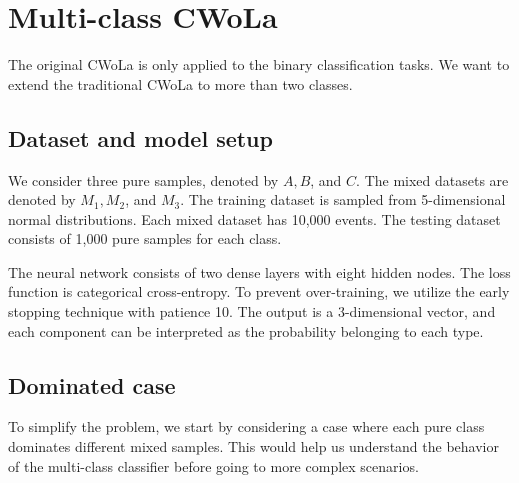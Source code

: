 \documentclass[12pt]{article}
\begin{document}
\section{Multi-class CWoLa}%
\label{sec:multi_class_cwola}
    The original CWoLa is only applied to the binary classification tasks. We want to extend the traditional CWoLa to more than two classes.

    \subsection{Dataset and model setup}%
    \label{sub:dataset_and_model_setup}
        We consider three pure samples, denoted by $A, B$, and $C$. The mixed datasets are denoted by $M_1, M_2$, and $M_3$. The training dataset is sampled from 5-dimensional normal distributions. Each mixed dataset has 10,000 events. The testing dataset consists of 1,000 pure samples for each class.

        The neural network consists of two dense layers with eight hidden nodes. The loss function is categorical cross-entropy. To prevent over-training, we utilize the early stopping technique with patience 10. The output is a 3-dimensional vector, and each component can be interpreted as the probability belonging to each type.
    \subsection{Dominated case}%
    \label{sub:dominated_case}
        To simplify the problem, we start by considering a case where each pure class dominates different mixed samples. This would help us understand the behavior of the multi-class classifier before going to more complex scenarios.
\end{document}
